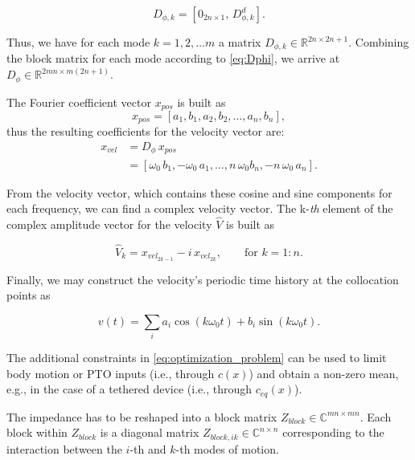 \documentclass[]{article}
\begin{document}
\begin{equation}
	D_{\phi,k} = [0_{2n\times1},\, D^d_{\phi,k}] .
\end{equation}

\noindent{}Thus, we have for each mode $k=1,2,\dots m$ a matrix $D_{\phi,k} \in \mathbb{R}^{2n\times2n+1}$.
Combining the block matrix for each mode according to \eqref{eq:Dphi}, we arrive at $D_{\phi} \in \mathbb{R}^{2mn \times m(2n+1)}$.

The Fourier coefficient vector $x_{pos}$ is built as
\begin{equation}
	x_{pos} = [a_1, b_1, a_2, b_2, \ldots, a_n, b_n],
\end{equation}
thus the resulting coefficients for the velocity vector are:
\begin{equation}
	\begin{aligned}
		x_{vel} &= D_{\phi} \, x_{pos}\\
		&= [\omega_0 \, b_1, -\omega_0 \, a_1, \ldots, n \, \omega_0 b_n, -n \, \omega_0 \, a_n].
	\end{aligned}
\end{equation}

\noindent{}From the velocity vector, which contains these cosine and sine components for each frequency, we can find a complex velocity vector.
The k-\textit{th} element of the complex amplitude vector for the velocity $\hat{V}$ is built as

\begin{equation}\label{eq:ps_to_ca}
	\hat{V}_k = x_{vel_{2k-1}} - i \, x_{vel_{2k}}, \qquad \textrm{for } k=1:n.
\end{equation}

\noindent{}Finally, we may construct the velocity's periodic time history at the collocation points as 

\begin{equation}
	v(t) = \sum\limits_i a_i \cos \left( k \omega_0 t \right) + b_i \sin \left( k \omega_0 t \right) .
\end{equation}


The additional constraints in \eqref{eq:optimization_problem} can be used to limit body motion or PTO inputs (i.e., through $c(x)$) and obtain a non-zero mean, e.g., in the case of a tethered device (i.e., through $c_{eq}(x)$).


The impedance has to be reshaped into a block matrix $Z_{block} \in \mathbb{C}^{mn \times mn}$.
Each block within $Z_{block}$ is a diagonal matrix $Z_{block,ik} \in \mathbb{C}^{n \times n}$ corresponding to the interaction between the $i$-th and $k$-th modes of motion.
\end{document}
